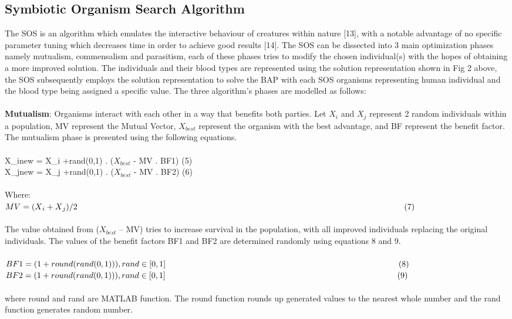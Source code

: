 \documentclass{article}
\newcommand\tab[1][1cm]{\hspace*{#1}}
\begin{document}
\subsection{Symbiotic Organism Search Algorithm}
The SOS is an algorithm which emulates the interactive behaviour of creatures within nature [13], with a notable advantage of no specific parameter tuning which decreases time in order to achieve good results [14]. The SOS can be dissected into 3 main optimization phases namely mutualism, commensalism and parasitism, each of these phases tries to modify the chosen individual(s) with the hopes of obtaining a more improved solution. The individuals and their blood types are represented using the solution representation shown in Fig 2 above, the SOS subsequently employs the solution representation to solve the BAP with each SOS organisms representing human individual and the blood type being assigned a specific value. The three algorithm’s phases are modelled as follows: \\
\\
\textbf{Mutualism}: Organisms interact with each other in a way that benefits both parties. Let $X{_i}$  and $X{_j}$  represent 2 random individuals within a population, MV represent the Mutual Vector, $X{_{best}}$ represent the organism with the best advantage, and BF represent the benefit factor. The mutualism phase is presented using the following equations.
\\
\\
X{_{inew}} = X{_i} +rand(0,1) . ($X{_{best}}$ - MV . BF1)\tab[10cm] (5)\\
X{_{jnew}} = X{_j} +rand(0,1) . ($X{_{best}}$ - MV . BF2)\tab[9,97cm] (6)\\
\\
Where:
\\
$MV=(X{_i} + X{_j})/2\tab[14cm](7)$\\
\\
The value obtained from ($X{_{best}}$ – MV) tries to increase survival in the population, with all improved individuals replacing the original individuals. The values of the benefit factors BF1 and BF2 are determined randomly using equations 8 and 9.\\
\\
$BF1 = (1 + round(rand(0,1))), rand \in [0,1]\tab[10cm](8)$\\
$BF2 = (1 + round(rand(0,1))), rand \in [0,1]\tab[9,95cm](9)$
\\
\\
where round and rand are MATLAB function. The round function rounds up generated values to the nearest whole number and the rand function generates random number.
\end{document}
